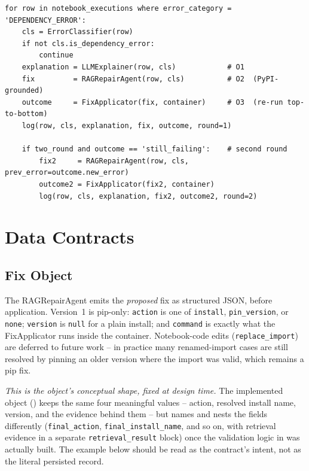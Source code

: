\begin{verbatim}
for row in notebook_executions where error_category = 'DEPENDENCY_ERROR':
    cls = ErrorClassifier(row)
    if not cls.is_dependency_error:
        continue
    explanation = LLMExplainer(row, cls)            # O1
    fix         = RAGRepairAgent(row, cls)          # O2  (PyPI-grounded)
    outcome     = FixApplicator(fix, container)     # O3  (re-run top-to-bottom)
    log(row, cls, explanation, fix, outcome, round=1)

    if two_round and outcome == 'still_failing':    # second round
        fix2     = RAGRepairAgent(row, cls, prev_error=outcome.new_error)
        outcome2 = FixApplicator(fix2, container)
        log(row, cls, explanation, fix2, outcome2, round=2)
\end{verbatim}

\section{Data Contracts}
\label{sec:data-contracts}

\subsection{Fix Object}
\label{subsec:fix-object}

The RAGRepairAgent emits the \emph{proposed} fix as structured JSON,
before application. Version~1 is pip-only: \texttt{action} is one of
\texttt{install}, \texttt{pin\_version}, or \texttt{none}; \texttt{version}
is \texttt{null} for a plain install; and \texttt{command} is exactly what
the FixApplicator runs inside the container. Notebook-code edits
(\texttt{replace\_import}) are deferred to future work -- in practice many
renamed-import cases are still resolved by pinning an older version where
the import was valid, which remains a pip fix.

\emph{This is the object's conceptual shape, fixed at design time.} The
implemented object () keeps the same four meaningful
values -- action, resolved install name, version, and the evidence behind
them -- but names and nests the fields differently
(\texttt{final\_action}, \texttt{final\_install\_name}, and so on, with
retrieval evidence in a separate \texttt{retrieval\_result} block) once the
validation logic in  was actually built. The example
below should be read as the contract's intent, not as the literal persisted
record.

